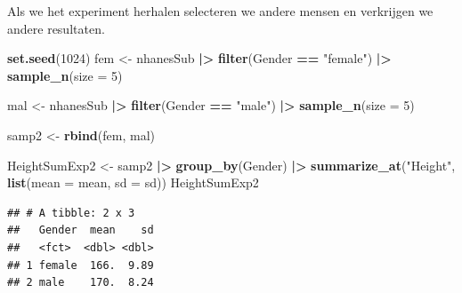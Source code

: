\documentclass[
  12pt,dutch]{book}
\newenvironment{Shaded}{\begin{snugshade}}{\end{snugshade}}
\newcommand{\AttributeTok}[1]{\textcolor[rgb]{0.13,0.29,0.53}{#1}}
\newcommand{\DecValTok}[1]{\textcolor[rgb]{0.00,0.00,0.81}{#1}}
\newcommand{\FunctionTok}[1]{\textcolor[rgb]{0.13,0.29,0.53}{\textbf{#1}}}
\newcommand{\NormalTok}[1]{#1}
\newcommand{\OtherTok}[1]{\textcolor[rgb]{0.56,0.35,0.01}{#1}}
\newcommand{\SpecialCharTok}[1]{\textcolor[rgb]{0.81,0.36,0.00}{\textbf{#1}}}
\newcommand{\StringTok}[1]{\textcolor[rgb]{0.31,0.60,0.02}{#1}}
\theoremstyle{definition}
\theoremstyle{definition}
\theoremstyle{definition}
\theoremstyle{definition}
\theoremstyle{remark}
\begin{document}
Als we het experiment herhalen selecteren we andere mensen en verkrijgen we andere resultaten.

\begin{Shaded}
\begin{Highlighting}[]
\FunctionTok{set.seed}\NormalTok{(}\DecValTok{1024}\NormalTok{)}
\NormalTok{fem }\OtherTok{\textless{}{-}}\NormalTok{ nhanesSub }\SpecialCharTok{|\textgreater{}}
    \FunctionTok{filter}\NormalTok{(Gender }\SpecialCharTok{==} \StringTok{"female"}\NormalTok{) }\SpecialCharTok{|\textgreater{}}
    \FunctionTok{sample\_n}\NormalTok{(}\AttributeTok{size =} \DecValTok{5}\NormalTok{)}

\NormalTok{mal }\OtherTok{\textless{}{-}}\NormalTok{ nhanesSub }\SpecialCharTok{|\textgreater{}}
    \FunctionTok{filter}\NormalTok{(Gender }\SpecialCharTok{==} \StringTok{"male"}\NormalTok{) }\SpecialCharTok{|\textgreater{}}
    \FunctionTok{sample\_n}\NormalTok{(}\AttributeTok{size =} \DecValTok{5}\NormalTok{)}

\NormalTok{samp2 }\OtherTok{\textless{}{-}} \FunctionTok{rbind}\NormalTok{(fem, mal)}

\NormalTok{HeightSumExp2 }\OtherTok{\textless{}{-}}\NormalTok{ samp2 }\SpecialCharTok{|\textgreater{}}
    \FunctionTok{group\_by}\NormalTok{(Gender) }\SpecialCharTok{|\textgreater{}}
    \FunctionTok{summarize\_at}\NormalTok{(}\StringTok{"Height"}\NormalTok{, }\FunctionTok{list}\NormalTok{(}\AttributeTok{mean =}\NormalTok{ mean, }\AttributeTok{sd =}\NormalTok{ sd))}
\NormalTok{HeightSumExp2}
\end{Highlighting}
\end{Shaded}

\begin{verbatim}
## # A tibble: 2 x 3
##   Gender  mean    sd
##   <fct>  <dbl> <dbl>
## 1 female  166.  9.89
## 2 male    170.  8.24
\end{verbatim}
\end{document}
